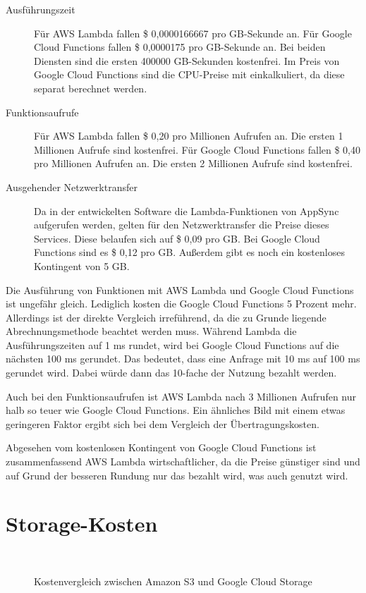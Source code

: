 \begin{description}
  \item[Ausführungszeit] Für AWS Lambda fallen \$ 0,0000166667 pro GB-Sekunde an. Für Google Cloud Functions fallen \$ 0,0000175 pro GB-Sekunde an. Bei beiden Diensten sind die ersten 400000 GB-Sekunden kostenfrei. Im Preis von Google Cloud Functions sind die CPU-Preise mit einkalkuliert, da diese separat berechnet werden.
  \item[Funktionsaufrufe] Für AWS Lambda fallen \$ 0,20 pro Millionen Aufrufen an. Die ersten 1 Millionen Aufrufe sind kostenfrei. Für Google Cloud Functions fallen \$ 0,40 pro Millionen Aufrufen an. Die ersten 2 Millionen Aufrufe sind kostenfrei.
  \item[Ausgehender Netzwerktransfer] Da in der entwickelten Software die Lambda-Funktionen von AppSync aufgerufen werden, gelten für den Netzwerktransfer die Preise dieses Services. Diese belaufen sich auf \$ 0,09 pro GB. Bei Google Cloud Functions sind es \$ 0,12 pro GB. Außerdem gibt es noch ein kostenloses Kontingent von 5 GB.
\end{description}

Die Ausführung von Funktionen mit \ac{AWS} Lambda und Google Cloud Functions ist ungefähr gleich. Lediglich kosten die Google Cloud Functions 5 Prozent mehr. Allerdings ist der direkte Vergleich irreführend, da die zu Grunde liegende Abrechnungsmethode beachtet werden muss. Während Lambda die Ausführungszeiten auf 1 ms rundet, wird bei Google Cloud Functions auf die nächsten 100 ms gerundet. Das bedeutet, dass eine Anfrage mit 10 ms auf 100 ms gerundet wird. Dabei würde dann das 10-fache der Nutzung bezahlt werden.

Auch bei den Funktionsaufrufen ist \ac{AWS} Lambda nach 3 Millionen Aufrufen nur halb so teuer wie Google Cloud Functions. Ein ähnliches Bild mit einem etwas geringeren Faktor ergibt sich bei dem Vergleich der Übertragungskosten.

Abgesehen vom kostenlosen Kontingent von Google Cloud Functions ist zusammenfassend \ac{AWS} Lambda wirtschaftlicher, da die Preise günstiger sind und auf Grund der besseren Rundung nur das bezahlt wird, was auch genutzt wird.

\section{Storage-Kosten}

\begin{figure}
  \centering
  \quad
  \\
  \quad
  \caption{Kostenvergleich zwischen Amazon S3 und Google Cloud Storage}
  \label{kostenvergleichStorage}
\end{figure}

